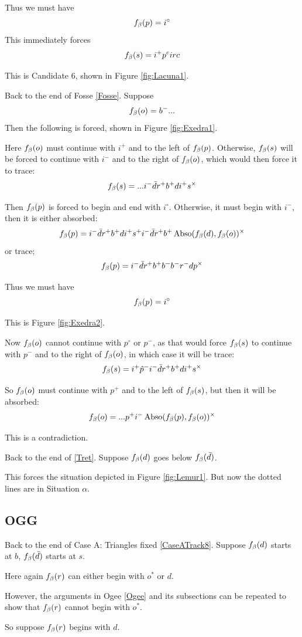 Thus we must have
\[
f_\beta(p) = i^\circ
\]
This immediately forces 
\[
f_\beta(s) = i^+ p^circ
\]

This is Candidate 6, shown in Figure \ref{fig:Lacuna1}.

\label{Exedra}
Back to the end of Fosse \ref{Fosse}. Suppose
\[
f_\beta(o) = b^-...
\]
Then the following is forced, shown in Figure \ref{fig:Exedra1}.

Here $f_\beta(o)$ must continue with $i^+$ and to the left of $f_\beta(p)$. Otherwise, $f_\beta(s)$ will be forced to continue with $i^-$ and to the right of $f_\beta(o)$, which would then force it to trace:
\[
f_\beta(s) = ...i^- \bar{d} r^+ b^+ d i^+ s^\times
\]

Then $f_\beta(p)$ is forced to begin and end with $i^\circ$. Otherwise, it must begin with $i^-$, then it is either absorbed:
\[
f_\beta(p) = i^- \bar{d} r^+ b^+ d i^+ s^+ i^- \bar{d} r^+ b^+ \operatorname{Abso}(f_\beta(d), f_\beta(o))^\times
\]
or trace;
\[
f_\beta(p) = i^- \bar{d} r^+ b^+ b^- b^- r^- d p^\times
\]

Thus we must have
\[
f_\beta(p) = i^\circ
\]

This is Figure \ref{fig:Exedra2}.

Now $f_\beta(o)$ cannot continue with $p^\circ$ or $p^-$, as that would force $f_\beta(s)$ to continue with $p^-$ and to the right of $f_\beta(o)$, in which case it will be trace:
\[
f_\beta(s) = i^+ \hat{p}^- i^- \bar{d} r^+ b^+ d i^+ s^\times
\]

So $f_\beta(o)$ must continue with $p^+$ and to the left of $f_\beta(s)$, but then it will be absorbed:
\[
f_\beta(o) = ...p^+ i^- \operatorname{Abso}(f_\beta(p), f_\beta(o))^\times
\]

This is a contradiction.

\label{Lemur}
Back to the end of \ref{Tret}. Suppose $f_\beta(d)$ goes below $f_\beta(\bar{d})$.

This forces the situation depicted in Figure \ref{fig:Lemur1}. But now the dotted lines are in Situation $\alpha$.

\subsection{OGG}\label{OGG}
Back to the end of Case A: Triangles fixed \ref{CaseATrack8}. Suppose $f_\beta(d)$ starts at $b$,
$f_\beta(\bar{d})$ starts at $s$.

Here again $f_\beta(r)$ can either begin with $o^*$ or $d$.

However, the arguments in Ogee \ref{Ogee} and its subsections can be repeated to show that $f_\beta(r)$ cannot begin with $o^*$. 

So suppose $f_\beta(r)$ begins with $d$. 


